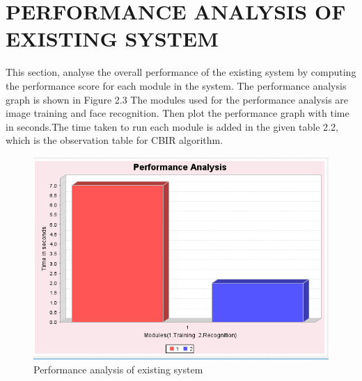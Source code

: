 \section[Performance Analysis of Existing System]{\fontsize{14}{12}\selectfont PERFORMANCE ANALYSIS OF EXISTING SYSTEM}
This section, analyse the overall performance of the existing system by computing the
performance score for each module in the system. The performance analysis graph is shown in Figure 2.3 The modules used for the performance analysis  are image training and  face recognition. Then plot the performance graph with time in seconds.The time taken to run each module is added in the given table 2.2, which is the observation table for CBIR algorithm.
\\ 
 \begin{figure}[h]
 \centering
  \includegraphics[scale=0.6]{cbir.png}
  \caption[Performance Analysis of Existing System]{ Performance analysis of existing system}
  \label{table1}
\end{figure}
\vspace{1 cm}

